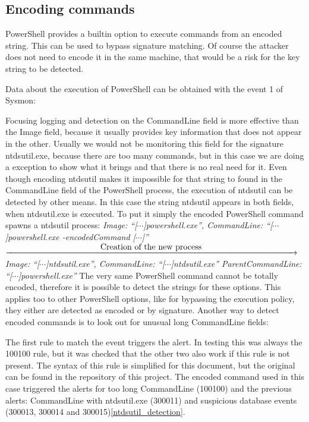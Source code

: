 \subsection{Encoding commands}
PowerShell provides a builtin option to execute commands from an encoded string. This can be used to bypass signature matching. Of course the attacker does not need to encode it in the same machine, that would be a risk for the key string to be detected.
\linej

\linej
Data about the execution of PowerShell can be obtained with the event 1 of Sysmon:

\linej
Focusing logging and detection on the CommandLine field is more effective than the Image field, because it usually provides key information that does not appear in the other. Usually we would not be monitoring this field for the signature ntdsutil.exe, because there are too many commands, but in this case we are doing a exception to show what it brings and that there is no real need for it.
\linej
Even though encoding ntdsutil makes it impossible for that string to found in the CommandLine field of the PowerShell process, the execution of ntdsutil can be detected by other means. In this case the string ntdsutil appears in both fields, when ntdsutil.exe is executed.
\linej
\linej
\linej
To put it simply the encoded PowerShell command spawns a ntdsutil process:
\linej
\lineh
\textit{Image: ``[$\cdots$]powershell.exe'',
\linej
CommandLine: ``[$\cdots$]powershell.exe -encodedCommand [$\cdots$]''}
\linej
\linej
$\xrightarrow{\makebox[\textwidth]{Creation of the new process}}$
\textit{Image: ``[$\cdots$]ntdsutil.exe'',
\linej
CommandLine: ``[$\cdots$]ntdsutil.exe''
\linej
ParentCommandLine: ``[$\cdots$]powershell.exe''}
\linej
\lineh
\linej
\linej
The very same PowerShell command cannot be totally encoded, therefore it is possible to detect the strings for these options. This applies too to other PowerShell options, like for bypassing the execution policy, they either are detected as encoded or by signature\cite{powershell_adsecurity}.
Another way to detect encoded commands is to look out for unusual long CommandLine fields:

\linej
The first rule to match the event triggers the alert.
In testing this was always the 100100 rule, but it was checked that the other two also work if this rule is not present.
The syntax of this rule is simplified for this document, but the original can be found in the repository of this project\cite{memoria_github}.
\linej
\linej
The encoded command used in this case triggered the alerts for too long CommandLine (100100) and the previous alerts: CommandLine with ntdsutil.exe (300011) and suspicious database events (300013, 300014 and 300015)\ref{ntdsutil_detection}.

